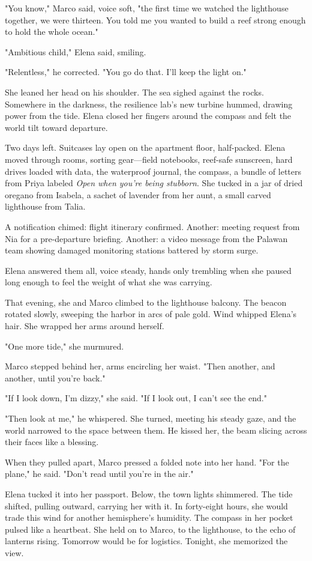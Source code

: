 "You know," Marco said, voice soft, "the first time we watched the lighthouse together, we were thirteen. You told me you wanted to build a reef strong enough to hold the whole ocean."

"Ambitious child," Elena said, smiling.

"Relentless," he corrected. "You go do that. I'll keep the light on."

She leaned her head on his shoulder. The sea sighed against the rocks. Somewhere in the darkness, the resilience lab's new turbine hummed, drawing power from the tide. Elena closed her fingers around the compass and felt the world tilt toward departure.

\bigskip

Two days left. Suitcases lay open on the apartment floor, half-packed. Elena moved through rooms, sorting gear—field notebooks, reef-safe sunscreen, hard drives loaded with data, the waterproof journal, the compass, a bundle of letters from Priya labeled \textit{Open when you're being stubborn}. She tucked in a jar of dried oregano from Isabela, a sachet of lavender from her aunt, a small carved lighthouse from Talia.

A notification chimed: flight itinerary confirmed. Another: meeting request from Nia for a pre-departure briefing. Another: a video message from the Palawan team showing damaged monitoring stations battered by storm surge.

Elena answered them all, voice steady, hands only trembling when she paused long enough to feel the weight of what she was carrying.

That evening, she and Marco climbed to the lighthouse balcony. The beacon rotated slowly, sweeping the harbor in arcs of pale gold. Wind whipped Elena's hair. She wrapped her arms around herself.

"One more tide," she murmured.

Marco stepped behind her, arms encircling her waist. "Then another, and another, until you're back."

"If I look down, I'm dizzy," she said. "If I look out, I can't see the end."

"Then look at me," he whispered. She turned, meeting his steady gaze, and the world narrowed to the space between them. He kissed her, the beam slicing across their faces like a blessing.

When they pulled apart, Marco pressed a folded note into her hand. "For the plane," he said. "Don't read until you're in the air."

Elena tucked it into her passport. Below, the town lights shimmered. The tide shifted, pulling outward, carrying her with it. In forty-eight hours, she would trade this wind for another hemisphere's humidity. The compass in her pocket pulsed like a heartbeat. She held on to Marco, to the lighthouse, to the echo of lanterns rising. Tomorrow would be for logistics. Tonight, she memorized the view.
